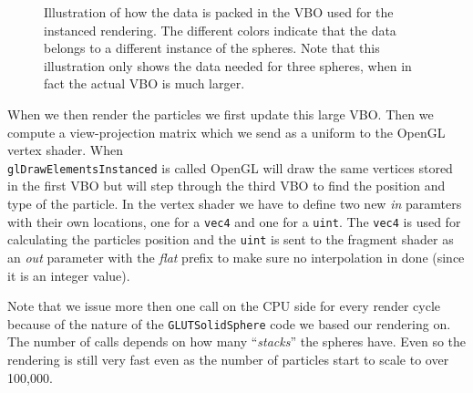 \documentclass[a4paper]{article}
\begin{document}
\begin{figure}[h]
\centering


\caption{Illustration of how the data is packed in the VBO used for the instanced rendering. 
The different colors indicate that the data belongs to a different instance of the spheres. 
Note that this illustration only shows the data needed for three spheres, when in fact the actual VBO is much larger.}
\label{instanced_figure}

\end{figure}

When we then render the particles we first update this large VBO. 
Then we compute a view-projection matrix which we send as a uniform to the OpenGL vertex shader. 
When\\ \verb|glDrawElementsInstanced| is called OpenGL will draw the same vertices stored in the first VBO but will step through the third VBO to find the position and type of the particle. 
In the vertex shader we have to define two new \emph{in} paramters with their own locations, one for a \verb|vec4| and one for a \verb|uint|. 
The \verb|vec4| is used for calculating the particles position and the \verb|uint| is sent to the fragment shader as an \emph{out} parameter with the \emph{flat} prefix to make sure no interpolation in done (since it is an integer value).   

Note that we issue more then one call on the CPU side for every render cycle because of the nature of the \verb|GLUTSolidSphere| code we based our rendering on.
The number of calls depends on how many ``\emph{stacks}'' the spheres have.
Even so the rendering is still very fast even as the number of particles start to scale to over 100,000. 
\end{document}
